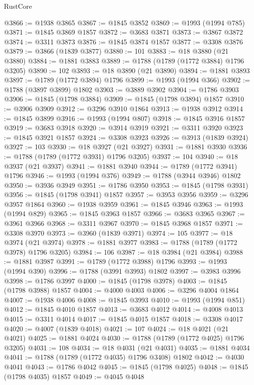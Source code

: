 \begin{lexlean}{RustCore}
\begin{coremodule}
@3866 := @1938 @3865
@3867 := @1845 @3852
@3869 := @1993 (@1994 @785)
@3871 := @1845 @3869 @1857
@3872 := @3683 @3871
@3873 := @3867 @3872
@3874 := @3311 @3873
@3876 := @1845 @3874 @1857
@3877 := @3308 @3876
@3879 := @3866 (@1839 @3877)
@3880 := 101
@3883 := @18 @3880 (@21 @3880)
@3884 := @1881 @3883
@3889 := @1788 (@1789 (@1772 @3884) @1796 @3205)
@3890 := 102
@3893 := @18 @3890 (@21 @3890)
@3894 := @1881 @3893
@3897 := @1789 (@1772 @3894) @1796
@3899 := @1993 (@1994 @366)
@3902 := @1788 (@3897 @3899) @1802
@3903 := @3889 @3902
@3904 := @1786 @3903
@3906 := @1845 (@1798 @3884)
@3909 := @1845 (@1798 @3894) @1857
@3910 := @3906 @3909
@3912 := @3296 @3910 @1864
@3913 := @1938 @3912
@3914 := @1845 @3899
@3916 := @1993 (@1994 @807)
@3918 := @1845 @3916 @1857
@3919 := @3683 @3918
@3920 := @3914 @3919
@3921 := @3311 @3920
@3923 := @1845 @3921 @1857
@3924 := @3308 @3923
@3926 := @3913 (@1839 @3924)
@3927 := 103
@3930 := @18 @3927 (@21 @3927)
@3931 := @1881 @3930
@3936 := @1788 (@1789 (@1772 @3931) @1796 @3205)
@3937 := 104
@3940 := @18 @3937 (@21 @3937)
@3941 := @1881 @3940
@3944 := @1789 (@1772 @3941) @1796
@3946 := @1993 (@1994 @376)
@3949 := @1788 (@3944 @3946) @1802
@3950 := @3936 @3949
@3951 := @1786 @3950
@3953 := @1845 (@1798 @3931)
@3956 := @1845 (@1798 @3941) @1857
@3957 := @3953 @3956
@3959 := @3296 @3957 @1864
@3960 := @1938 @3959
@3961 := @1845 @3946
@3963 := @1993 (@1994 @829)
@3965 := @1845 @3963 @1857
@3966 := @3683 @3965
@3967 := @3961 @3966
@3968 := @3311 @3967
@3970 := @1845 @3968 @1857
@3971 := @3308 @3970
@3973 := @3960 (@1839 @3971)
@3974 := 105
@3977 := @18 @3974 (@21 @3974)
@3978 := @1881 @3977
@3983 := @1788 (@1789 (@1772 @3978) @1796 @3205)
@3984 := 106
@3987 := @18 @3984 (@21 @3984)
@3988 := @1881 @3987
@3991 := @1789 (@1772 @3988) @1796
@3993 := @1993 (@1994 @390)
@3996 := @1788 (@3991 @3993) @1802
@3997 := @3983 @3996
@3998 := @1786 @3997
@4000 := @1845 (@1798 @3978)
@4003 := @1845 (@1798 @3988) @1857
@4004 := @4000 @4003
@4006 := @3296 @4004 @1864
@4007 := @1938 @4006
@4008 := @1845 @3993
@4010 := @1993 (@1994 @851)
@4012 := @1845 @4010 @1857
@4013 := @3683 @4012
@4014 := @4008 @4013
@4015 := @3311 @4014
@4017 := @1845 @4015 @1857
@4018 := @3308 @4017
@4020 := @4007 (@1839 @4018)
@4021 := 107
@4024 := @18 @4021 (@21 @4021)
@4025 := @1881 @4024
@4030 := @1788 (@1789 (@1772 @4025) @1796 @3205)
@4031 := 108
@4034 := @18 @4031 (@21 @4031)
@4035 := @1881 @4034
@4041 := @1788 (@1789 (@1772 @4035) @1796 @3408) @1802
@4042 := @4030 @4041
@4043 := @1786 @4042
@4045 := @1845 (@1798 @4025)
@4048 := @1845 (@1798 @4035) @1857
@4049 := @4045 @4048

\end{coremodule}
\end{lexlean}
